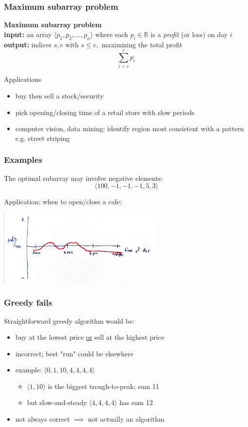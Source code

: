 \documentclass{beamer}
\begin{document}
\begin{frame} \frametitle{Maximum subarray problem}
  \textbf{Maximum subarray problem} \\
  \textbf{input: } an array $\langle p_1, p_2, \ldots, p_n \rangle$ where each
    $p_i \in \mathbb{R}$ is a \emph{profit} (or loss) on day $i$ \\
  \textbf{output: } indices $s, e$ with $s \leq e,$ maximizing the total profit
    \[ \sum_{i=s}^e p_i \]

  Applications
  \begin{itemize}
    \item buy then sell a stock/security
    \item pick opening/closing time of a retail store with slow periods
    \item computer vision, data mining: identify region most consistent with
      a pattern e.g. street striping
  \end{itemize}
\end{frame}

\begin{frame} \frametitle{Examples}
  The optimal subarray may involve negative elements:
  \[ \langle 100, -1, -1, -1, 5, 3 \rangle \]

  Application: when to open/close a cafe:
  \begin{center}
    \includegraphics[height=1.5in]{profit-loss.jpg}
  \end{center}
\end{frame}

\begin{frame} \frametitle{Greedy fails}
  Straightforward greedy algorithm would be:
  \begin{itemize}
    \item buy at the lowest price \underline{or} sell at the highest price
    \item incorrect; best "run" could be elsewhere
    \item example: $\langle 0, 1, 10, 4, 4, 4, 4\rangle$
      \begin{itemize}
      \item $\langle 1, 10 \rangle$ is the biggest trough-to-peak; sum 11
      \item but slow-and-steady $\langle 4, 4, 4, 4\rangle$ has sum 12
        \end{itemize}
    \item not always correct $\implies$ not actually an algorithm
  \end{itemize}

\end{frame}
\end{document}
